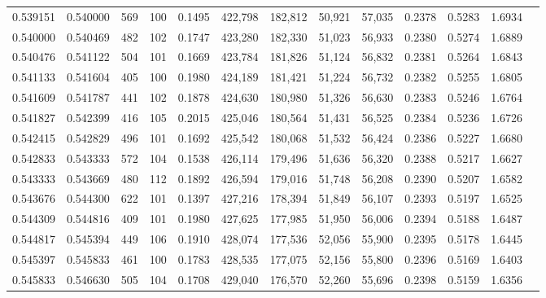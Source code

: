 \begin{tabular}{rrrrrrrrrrrrr}
0.539151 & 0.540000 &    569 &   100 &                                     0.1495 & 422,798 & 182,812 &  50,921 &  57,035 & 0.2378 & 0.5283 & 1.6934 \\
0.540000 & 0.540469 &    482 &   102 &                                     0.1747 & 423,280 & 182,330 &  51,023 &  56,933 & 0.2380 & 0.5274 & 1.6889 \\
0.540476 & 0.541122 &    504 &   101 &                                     0.1669 & 423,784 & 181,826 &  51,124 &  56,832 & 0.2381 & 0.5264 & 1.6843 \\
0.541133 & 0.541604 &    405 &   100 &                                     0.1980 & 424,189 & 181,421 &  51,224 &  56,732 & 0.2382 & 0.5255 & 1.6805 \\
0.541609 & 0.541787 &    441 &   102 &                                     0.1878 & 424,630 & 180,980 &  51,326 &  56,630 & 0.2383 & 0.5246 & 1.6764 \\
0.541827 & 0.542399 &    416 &   105 &                                     0.2015 & 425,046 & 180,564 &  51,431 &  56,525 & 0.2384 & 0.5236 & 1.6726 \\
0.542415 & 0.542829 &    496 &   101 &                                     0.1692 & 425,542 & 180,068 &  51,532 &  56,424 & 0.2386 & 0.5227 & 1.6680 \\
0.542833 & 0.543333 &    572 &   104 &                                     0.1538 & 426,114 & 179,496 &  51,636 &  56,320 & 0.2388 & 0.5217 & 1.6627 \\
0.543333 & 0.543669 &    480 &   112 &                                     0.1892 & 426,594 & 179,016 &  51,748 &  56,208 & 0.2390 & 0.5207 & 1.6582 \\
0.543676 & 0.544300 &    622 &   101 &                                     0.1397 & 427,216 & 178,394 &  51,849 &  56,107 & 0.2393 & 0.5197 & 1.6525 \\
0.544309 & 0.544816 &    409 &   101 &                                     0.1980 & 427,625 & 177,985 &  51,950 &  56,006 & 0.2394 & 0.5188 & 1.6487 \\
0.544817 & 0.545394 &    449 &   106 &                                     0.1910 & 428,074 & 177,536 &  52,056 &  55,900 & 0.2395 & 0.5178 & 1.6445 \\
0.545397 & 0.545833 &    461 &   100 &                                     0.1783 & 428,535 & 177,075 &  52,156 &  55,800 & 0.2396 & 0.5169 & 1.6403 \\
0.545833 & 0.546630 &    505 &   104 &                                     0.1708 & 429,040 & 176,570 &  52,260 &  55,696 & 0.2398 & 0.5159 & 1.6356 \\

\end{tabular}
